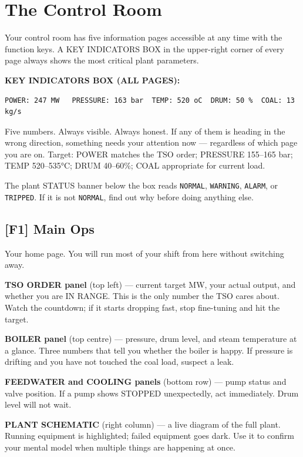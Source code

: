 \documentclass[10pt,a5paper]{article}
\newcommand{\key}[1]{\textbf{[#1]}}
\begin{document}
\section{The Control Room}

Your control room has five information pages accessible at any time with the
function keys. A KEY INDICATORS BOX in the upper-right corner of every page
always shows the most critical plant parameters.

\textbf{\uppercase{Key Indicators Box (all pages):}}

\begin{Verbatim}
POWER: 247 MW   PRESSURE: 163 bar  TEMP: 520 oC  DRUM: 50 %  COAL: 13 kg/s
\end{Verbatim}

Five numbers. Always visible. Always honest. If any of them is heading in the
wrong direction, something needs your attention now --- regardless of which page
you are on. Target: POWER matches the TSO order; PRESSURE 155--165 bar; TEMP
520--535°C; DRUM 40--60\%; COAL appropriate for current load.

The plant STATUS banner below the box reads \texttt{NORMAL}, \texttt{WARNING},
\texttt{ALARM}, or \texttt{TRIPPED}. If it is not \texttt{NORMAL}, find out why
before doing anything else.

\subsection{\key{F1} Main Ops}

Your home page. You will run most of your shift from here without switching away.

\textbf{TSO ORDER panel} (top left) --- current target MW, your actual output,
and whether you are IN RANGE. This is the only number the TSO cares about.
Watch the countdown; if it starts dropping fast, stop fine-tuning and hit
the target.

\textbf{BOILER panel} (top centre) --- pressure, drum level, and steam
temperature at a glance. Three numbers that tell you whether the boiler is
happy. If pressure is drifting and you have not touched the coal load, suspect
a leak.

\textbf{FEEDWATER and COOLING panels} (bottom row) --- pump status and valve
position. If a pump shows STOPPED unexpectedly, act immediately. Drum level
will not wait.

\textbf{PLANT SCHEMATIC} (right column) --- a live diagram of the full plant.
Running equipment is highlighted; failed equipment goes dark. Use it to confirm
your mental model when multiple things are happening at once.
\end{document}
